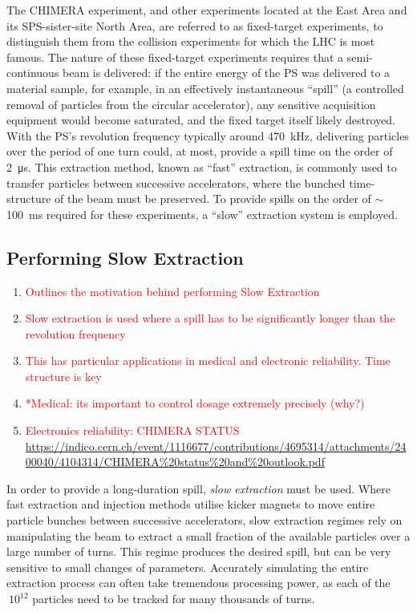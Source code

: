 \documentclass[11pt]{report}
\newcommand\todo[1]{\textcolor{red}{#1}}
\begin{document}
The CHIMERA experiment, and other experiments located at the East Area and its SPS-sister-site North Area, are referred to as fixed-target experiments, to distinguish them from the collision experiments for which the LHC is most famous. The nature of these fixed-target experiments requires that a semi-continuous beam is delivered: if the entire energy of the PS was delivered to a material sample, for example, in an effectively instantaneous ``spill'' (a controlled removal of particles from the circular accelerator), any sensitive acquisition equipment would become saturated, and the fixed target itself likely destroyed. With the PS's revolution frequency typically around \qty{470}{kHz}, delivering particles over the period of one turn could, at most, provide a spill time on the order of \qty{2}{\micro\second}. This extraction method, known as ``fast'' extraction, is commonly used to transfer particles between successive accelerators, where the bunched time-structure of the beam must be preserved. To provide spills on the order of $\sim$\qty{100}{\ms} required for these experiments, a ``slow'' extraction system is employed.

\subsection{Performing Slow Extraction}
\begin{enumerate}
  \item \todo{Outlines the motivation behind performing Slow Extraction}
  \item \todo{Slow extraction is used where a spill has to be significantly longer than the revolution frequency}
  \item \todo{This has particular applications in medical and electronic reliability. Time structure is key}
  \item \todo{*Medical: its important to control dosage extremely precisely (why?)}
  \item \todo{Electronics reliability: CHIMERA STATUS \url{https://indico.cern.ch/event/1116677/contributions/4695314/attachments/2400040/4104314/CHIMERA\%20status\%20and\%20outlook.pdf}}
\end{enumerate}


In order to provide a long-duration spill, {\it slow extraction} must be used. Where fast extraction and injection methods utilise kicker magnets to move entire particle bunches between successive accelerators, slow extraction regimes rely on manipulating the beam to extract a small fraction of the available particles over a large number of turns. This regime produces the desired spill, but can be very sensitive to small changes of parameters. Accurately simulating the entire extraction process can often take tremendous processing power, as each of the $~10^{12}$ particles need to be tracked for many thousands of turns.
\end{document}
